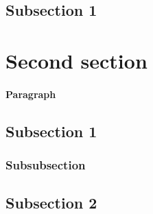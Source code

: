 \subsection{Subsection 1}\label{sub:one-one-one}
\lipsum[7-8]

\section{Second section}
\lipsum[9-10]

\paragraph{Paragraph} \lipsum[17-18]

\subsection{Subsection 1}
\lipsum[11-12]

\subsubsection{Subsubsection}
\lipsum[13-14]

\subsection{Subsection 2}
\lipsum[14-16]
